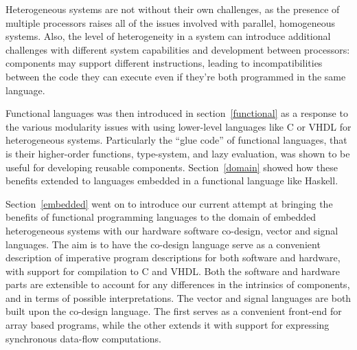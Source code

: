 \documentclass[../paper.tex]{subfiles}
\begin{document}
Heterogeneous systems are not without their own challenges, as the presence of multiple processors raises all of the issues involved with parallel, homogeneous systems. Also, the level of heterogeneity in a system can introduce additional challenges with different system capabilities and development between processors: components may support different instructions, leading to incompatibilities between the code they can execute even if they're both programmed in the same language.

Functional languages was then introduced in section~\ref{functional} as a response to the various modularity issues with using lower-level languages like C or VHDL for heterogeneous systems. Particularly the ``glue code'' of functional languages, that is their higher-order functions, type-system, and lazy evaluation, was shown to be useful for developing reusable components. Section~\ref{domain} showed how these benefits extended to languages embedded in a functional language like Haskell.

Section~\ref{embedded} went on to introduce our current attempt at bringing the benefits of functional programming languages to the domain of embedded heterogeneous systems with our hardware software co-design, vector and signal languages. The aim is to have the co-design language serve as a convenient description of imperative program descriptions for both software and hardware, with support for compilation to C and VHDL. Both the software and hardware parts are extensible to account for any differences in the intrinsics of components, and in terms of possible interpretations. The vector and signal languages are both built upon the co-design language. The first serves as a convenient front-end for array based programs, while the other extends it with support for expressing synchronous data-flow computations.
\end{document}
